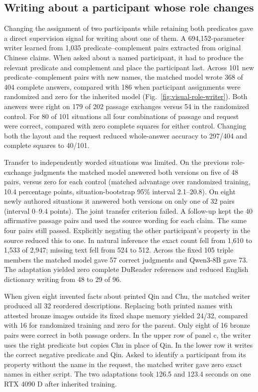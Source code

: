 \subsection*{Writing about a participant whose role changes}
Changing the assignment of two participants while retaining both predicates gave a direct supervision signal for writing about one of them. A 694,152-parameter writer learned from 1,035 predicate--complement pairs extracted from original Chinese claims. When asked about a named participant, it had to produce the relevant predicate and complement and place the participant last. Across 101 new predicate--complement pairs with new names, the matched model wrote 368 of 404 complete answers, compared with 186 when participant assignments were randomized and zero for the inherited model (Fig.~\ref{fig:visual-role-writer}). Both answers were right on 179 of 202 passage exchanges versus 54 in the randomized control. For 80 of 101 situations all four combinations of passage and request were correct, compared with zero complete squares for either control. Changing both the layout and the request reduced whole-answer accuracy to 297/404 and complete squares to 40/101.

Transfer to independently worded situations was limited. On the previous role-exchange judgments the matched model answered both versions on five of 48 pairs, versus zero for each control (matched advantage over randomized training, 10.4 percentage points, situation-bootstrap 95\% interval 2.1--20.8). On eight newly authored situations it answered both versions on only one of 32 pairs (interval 0--9.4 points). The joint transfer criterion failed. A follow-up kept the 40 affirmative passage pairs and used the source wording for each claim. The same four pairs still passed. Explicitly negating the other participant's property in the source reduced this to one. In natural inference the exact count fell from 1,610 to 1,533 of 2,947; missing text fell from 524 to 512. Across the fixed 105 triple members the matched model gave 57 correct judgments and Qwen3-8B gave 73. The adaptation yielded zero complete DuReader references and reduced English dictionary writing from 48 to 29 of 96.

When given eight invented facts about printed Qin and Chu, the matched writer produced all 32 reordered descriptions. Replacing both printed names with attested bronze images outside its fixed shape memory yielded 24/32, compared with 16 for randomized training and zero for the parent. Only eight of 16 bronze pairs were correct in both passage orders. In the upper row of panel c, the writer uses the right predicate but copies Chu in place of Qin. In the lower row it writes the correct negative predicate and Qin. Asked to identify a participant from its property without the name in the request, the matched writer gave zero exact names in either script. The two adaptations took 126.5 and 123.4 seconds on one RTX 4090 D after inherited training.

